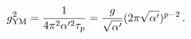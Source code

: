 \begin{equation}
g_{{\rm YM}}^2 = \frac{1}{4 \pi^2 \alpha'^2 \tau_p} 
= \frac{g}{\sqrt{\alpha'}}  (2 \pi \sqrt{\alpha'})^{p-2} \,.
\label{eq:ym-coupling}
\end{equation}

